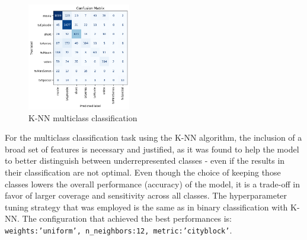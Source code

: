 



\begin{figure}
    \centering
    \includegraphics[width=0.40\textwidth]{plots/knn_multiclass_confmatrix.png}
    \caption{K-NN multiclass classification}
    \label{fig:multiclass_knn_confusion_matrix}
\end{figure}
For the multiclass classification task using the K-NN algorithm, the inclusion of a broad set of 
features is necessary and justified, as it was found to help the model to better distinguish between 
underrepresented classes - even if the results in their classification are not optimal. 
Even though the choice of keeping those classes lowers the overall performance (accuracy) of the model, 
it is a trade-off in favor of larger coverage and sensitivity across all classes.
The hyperparameter tuning strategy that was employed is the same as in binary classification with K-NN. 
The configuration that achieved the best performances is: \texttt{{weights:'uniform', n\_neighbors:12, metric:'cityblock'}}.\\ 

